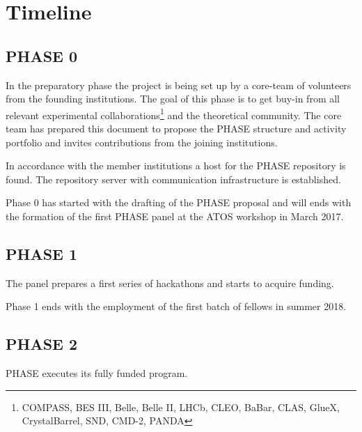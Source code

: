 \section{Timeline}

\subsection{PHASE 0}
In the preparatory phase the project is being set up by a core-team of volunteers from the founding institutions. The goal of this phase is to get buy-in from all relevant
experimental collaborations\footnote{COMPASS, BES III, Belle, Belle II, LHCb, CLEO, BaBar, CLAS, GlueX, CrystalBarrel, SND, CMD-2, PANDA} and the theoretical community.  The core team has prepared this document to propose the PHASE structure and activity portfolio and invites contributions from the joining institutions.

In accordance with the member institutions a host for the PHASE repository is found. The repository server with communication infrastructure is established.


Phase 0 has started with the drafting of the PHASE proposal and will ends with the formation of the first PHASE panel at the ATOS workshop in March 2017.

\subsection{PHASE 1}
The panel prepares a first series of hackathons and starts to acquire funding.

Phase 1 ends with the employment of the first batch of fellows in summer 2018.
\subsection{PHASE 2}
PHASE executes its fully funded program.